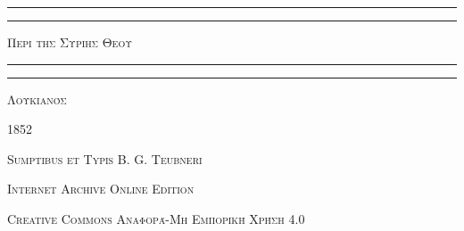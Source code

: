 \documentclass[a4paper, 11pt, oneside, polutonikogreek, german]{article}
\begin{document}
\bfseries
{}
\begin{titlepage} %
	\centering %


	\rule{\textwidth}{1.6pt}\vspace*{-\baselineskip}\vspace*{2pt} %
	\rule{\textwidth}{0.4pt} %
	
	\vspace{1\baselineskip} %
	
	{\scshape\Huge Περι της Συριης Θεου}
	
	\vspace{1\baselineskip} %

	\rule{\textwidth}{0.4pt}\vspace*{-\baselineskip}\vspace{3.2pt} %
	\rule{\textwidth}{1.6pt} %
	
	\vspace{1\baselineskip} %
	
	
	{\scshape \Large Λουκιανός}
 
        \vspace{0.5\baselineskip}
	
	\vspace*{1\baselineskip} %
	
        {\scshape \normalsize } %

        \vspace*{\fill}    

	\vspace{1\baselineskip}

	{\small\scshape 1852}
	
	{\small\scshape{Sumptibus et Typis B. G. Teubneri}}
	
	\vspace{0.5\baselineskip} %

        \scshape Internet Archive Online Edition%
    
	{\scshape\small Creative Commons Αναφορά-Μη Εμπορική Χρήση 4.0} %
\end{titlepage}
\setlength{\parskip}{1mm plus1mm minus1mm}
\clearpage
\large
\end{document}
